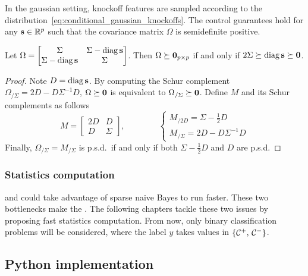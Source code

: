 In the gaussian setting,
knockoff features are sampled according to the distribution~\ref{eq:conditional_gaussian_knockoffs}.
The control guarantees hold for any $\mathbf{s} \in \mathbb{R}^p$ such that the covariance matrix $\Omega$ is semidefinite positive.
\begin{proposition}\label{prop:omega_psd}
    Let $\Omega = \begin{bmatrix}
        \Sigma & \Sigma - \operatorname*{diag} \mathbf{s}\\
        \Sigma - \operatorname*{diag} \mathbf{s} & \Sigma
    \end{bmatrix}$.
    Then $\Omega \succeq \mathbf{0}_{p \times p}$ if and only if $2\Sigma \succeq \operatorname*{diag} \mathbf{s} \succeq \mathbf{0}$.
\end{proposition}
\begin{proof}
    Note $D = \operatorname*{diag}\mathbf{s}$.
    By computing the Schur complement~\cite{schur_complement}
    $\Omega_{/\Sigma} = 2D - D\Sigma^{-1}D$,
    $\Omega \succeq \mathbf{0}$ is equivalent to $\Omega_{/\Sigma} \succeq \mathbf{0}$.
    Define $M$ and its Schur complements as follows
    \begin{equation*}
        M = \begin{bmatrix}
            2D & D\\
            D & \Sigma
        \end{bmatrix}
        ,\qquad\qquad
        \begin{cases*}
            M_{/2D} = \Sigma - \frac{1}{2}D\\
            M_{/\Sigma} = 2D - D\Sigma^{-1}D
        \end{cases*}
    \end{equation*}
    Finally, $\Omega_{/\Sigma} = M_{/\Sigma}$ is p.s.d.\ if and only if both $\Sigma - \frac{1}{2}D$ and $D$ are p.s.d.
\end{proof}

\subsubsection{Statistics computation}\label{subsubsec:bot_stats}

and could take advantage of sparse naive Bayes to run faster.
\bigbreak
These two bottlenecks make the .
The following chapters tackle these two issues by proposing fast statistics computation.
From now, only binary classification problems will be considered, where the label $y$ takes values
in $\left\{ \mathcal{C}^+,\, \mathcal{C}^- \right\}$.

\subsection{Python implementation}\label{subsec:python_implementation}

